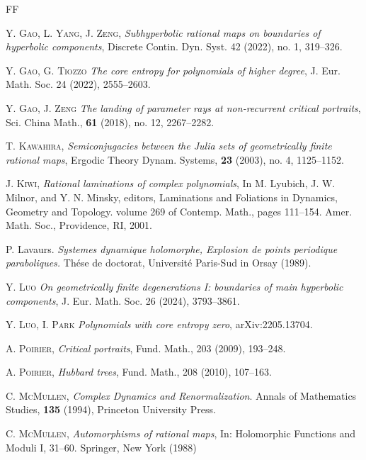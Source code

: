\documentclass[a4paper,reqno,times, 11pt]{amsart}
\theoremstyle{remark}
\theoremstyle{plain}
\numberwithin{equation}{section}
\begin{document}
\begin{thebibliography}{FF}
	
	
	\textsc{Y. Gao, L. Yang, J. Zeng,}
	\emph{Subhyperbolic rational maps on boundaries of hyperbolic components}, Discrete Contin. Dyn. Syst. 42 (2022), no. 1, 319–326.
	
	\textsc{Y. Gao, G. Tiozzo}
	\emph{The core entropy for polynomials of higher degree}, J. Eur. Math. Soc. 24 (2022), 2555--2603.
	
	
	\textsc{Y. Gao, J. Zeng}
	\textit{The landing of parameter rays at non-recurrent
		critical portraits},
	Sci. China Math., {\bf 61} (2018), no. 12, 2267--2282.
	
	\textsc{T. Kawahira,}
	\textit{Semiconjugacies between the Julia sets of geometrically finite rational maps}, Ergodic
	Theory Dynam. Systems, {\bf 23} (2003), no. 4, 1125--1152.
	
	\textsc{J. Kiwi},
	\textit{Rational laminations of complex polynomials}, In M. Lyubich, J. W. Milnor, and Y. N. Minsky, editors, {Laminations and Foliations in Dynamics, Geometry and Topology.} volume 269 of Contemp. Math., pages 111--154. Amer. Math. Soc., Providence, RI, 2001.
	
	 P. Lavaurs. {\it Systemes dynamique holomorphe, Explosion de points periodique paraboliques.} Th\'ese de doctorat, Universit\'e Paris-Sud in Orsay (1989).
	
	\textsc{Y. Luo}
	\textit{On geometrically finite degenerations I: boundaries of main hyperbolic components}, J. Eur. Math. Soc. 26 (2024), 3793–3861.
	
	\textsc{Y. Luo, I. Park}
	\emph{Polynomials with core entropy zero}, arXiv:2205.13704.
	
	
	\textsc{A. Poirier,}
	\emph{Critical portraits}, Fund. Math., 203 (2009), 193–248.
	
	\textsc{A. Poirier,}
	\emph{Hubbard trees}, Fund. Math., 208 (2010), 107–163.
	
	
	\textsc{C. McMullen,}
	{\it Complex Dynamics and Renormalization}. Annals of Mathematics Studies, {\bf 135} (1994), Princeton University Press.
	
	\textsc{C. McMullen},
	\textit{ Automorphisms of rational maps}, In: Holomorphic Functions and Moduli I, 31--60.
	Springer, New York (1988)
	

\end{thebibliography}
\end{document}

